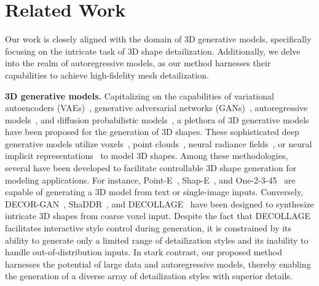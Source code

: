 \section{Related Work}
Our work is closely aligned with the domain of 3D generative models, specifically focusing on the intricate task of 3D shape detailization. Additionally, we delve into the realm of autoregressive models, as our method harnesses their capabilities to achieve high-fidelity mesh detailization.

\noindent\textbf{3D generative models.}
Capitalizing on the capabilities of variational autoencoders (VAEs)~\cite{vae,vqvae}, generative adversarial networks (GANs)~\cite{gan}, autoregressive models~\cite{pixelcnn,pixelcnnplus}, and diffusion probabilistic models~\cite{diffusion,DBLP:conf/icml/Sohl-DicksteinW15,DBLP:conf/iclr/0011SKKEP21}, a plethora of 3D generative models have been proposed for the generation of 3D shapes. These sophisticated deep generative models utilize voxels~\cite{DBLP:conf/nips/0001ZXFT16,DBLP:conf/eccv/ChoyXGCS16,xcube,DBLP:conf/3dim/HaneTM17}, point clouds~\cite{DBLP:conf/icml/AchlioptasDMG18,DBLP:conf/nips/zengVWGLFK22,craftsman,DBLP:conf/cvpr/FanSG17,DBLP:journals/tog/YinCHCZ19}, neural radiance fields~\cite{DreamFusion,magic3d,nerf,dreamgaussian,LGM,LRM}, or neural implicit representations~\cite{DBLP:conf/cvpr/GroueixFKRA18,pixel2mesh,DBLP:conf/iclr/ZhangCLGZ0F21,diffsdf,DBLP:conf/siggrapha/HuiLHF22,get3d,fantasia3d,neusdfusion,DBLP:conf/cvpr/ChenZ19,occnetwork,deepsdf,3dshape2vecset} to model 3D shapes. Among these methodologies, several have been developed to facilitate controllable 3D shape generation for modeling applications. For instance, Point-E~\cite{pointe}, Shap-E~\cite{shape}, and One-2-3-45~\cite{one2345} are capable of generating a 3D model from text or single-image inputs. Conversely, DECOR-GAN~\cite{decorgan}, ShaDDR~\cite{shaddr}, and DECOLLAGE~\cite{DECOLLAGE} have been designed to synthesize intricate 3D shapes from coarse voxel input. Despite the fact that DECOLLAGE~\cite{DECOLLAGE} facilitates interactive style control during generation, it is constrained by its ability to generate only a limited range of detailization styles and its inability to handle out-of-distribution inputs. In stark contrast, our proposed method harnesses the potential of large data and autoregressive models, thereby enabling the generation of a diverse array of detailization styles with superior details.

